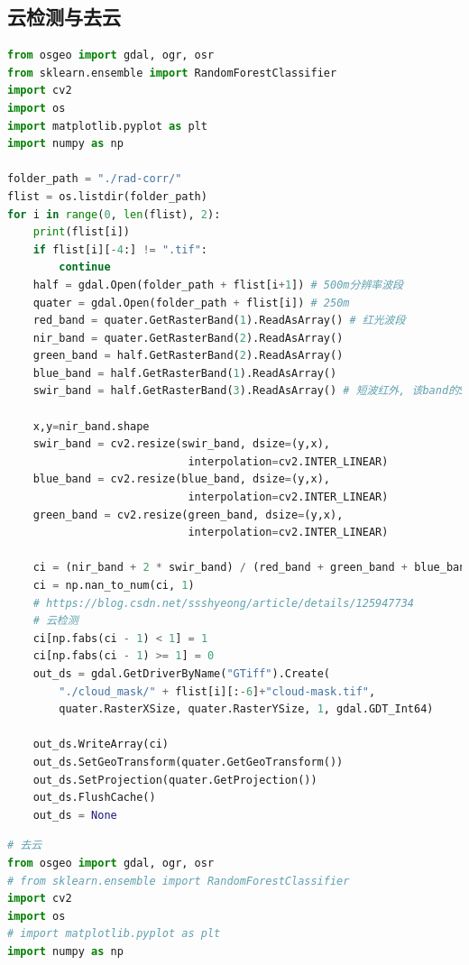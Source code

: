 \documentclass{ctexart}
\begin{document}
\begin{sloppypar}
\begin{appendices}
\subsection{云检测与去云}\label{cloud_test}
\begin{lstlisting}[frame=single, language=Python, basicstyle={\ttfamily}, caption={云检测}, label=codecloud]
from osgeo import gdal, ogr, osr
from sklearn.ensemble import RandomForestClassifier
import cv2
import os
import matplotlib.pyplot as plt
import numpy as np

folder_path = "./rad-corr/"
flist = os.listdir(folder_path)
for i in range(0, len(flist), 2):
    print(flist[i])
    if flist[i][-4:] != ".tif":
        continue
    half = gdal.Open(folder_path + flist[i+1]) # 500m分辨率波段
    quater = gdal.Open(folder_path + flist[i]) # 250m
    red_band = quater.GetRasterBand(1).ReadAsArray() # 红光波段
    nir_band = quater.GetRasterBand(2).ReadAsArray()
    green_band = half.GetRasterBand(2).ReadAsArray()
    blue_band = half.GetRasterBand(1).ReadAsArray()
    swir_band = half.GetRasterBand(3).ReadAsArray() # 短波红外, 该band的SNR较低

    x,y=nir_band.shape
    swir_band = cv2.resize(swir_band, dsize=(y,x),
                            interpolation=cv2.INTER_LINEAR)
    blue_band = cv2.resize(blue_band, dsize=(y,x),
                            interpolation=cv2.INTER_LINEAR)
    green_band = cv2.resize(green_band, dsize=(y,x),
                            interpolation=cv2.INTER_LINEAR)
    
    ci = (nir_band + 2 * swir_band) / (red_band + green_band + blue_band)
    ci = np.nan_to_num(ci, 1)
    # https://blog.csdn.net/ssshyeong/article/details/125947734
    # 云检测 
    ci[np.fabs(ci - 1) < 1] = 1
    ci[np.fabs(ci - 1) >= 1] = 0
    out_ds = gdal.GetDriverByName("GTiff").Create(
        "./cloud_mask/" + flist[i][:-6]+"cloud-mask.tif", 
        quater.RasterXSize, quater.RasterYSize, 1, gdal.GDT_Int64)
    
    out_ds.WriteArray(ci)
    out_ds.SetGeoTransform(quater.GetGeoTransform())
    out_ds.SetProjection(quater.GetProjection())
    out_ds.FlushCache()
    out_ds = None
\end{lstlisting}
\begin{lstlisting}[frame=single, language=Python, basicstyle={\ttfamily}, caption={去云}, label=coderemove-cloud]
# 去云
from osgeo import gdal, ogr, osr
# from sklearn.ensemble import RandomForestClassifier
import cv2
import os
# import matplotlib.pyplot as plt
import numpy as np


\end{lstlisting}
\end{appendices}
\end{sloppypar}
\end{document}
